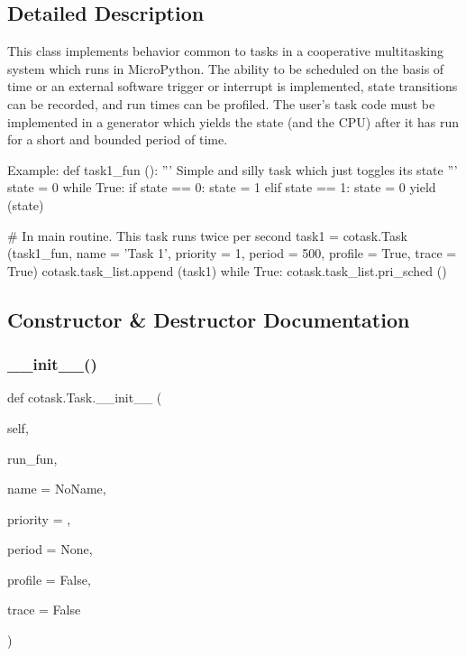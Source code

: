 \subsection{Detailed Description}
\begin{DoxyVerb}This class implements behavior common to tasks in a cooperative 
multitasking system which runs in MicroPython. The ability to be scheduled
on the basis of time or an external software trigger or interrupt is 
implemented, state transitions can be recorded, and run times can be
profiled. The user's task code must be implemented in a generator which
yields the state (and the CPU) after it has run for a short and bounded 
period of time. 

Example:
\code
def task1_fun ():
    ''' Simple and silly task which just toggles its state '''
    state = 0
    while True:
        if state == 0:
            state = 1
        elif state == 1:
            state = 0
        yield (state)

# In main routine. This task runs twice per second
task1 = cotask.Task (task1_fun, name = 'Task 1', priority = 1, 
                     period = 500, profile = True, trace = True)
cotask.task_list.append (task1)
while True: 
    cotask.task_list.pri_sched ()
\endcode \end{DoxyVerb}
 

\subsection{Constructor \& Destructor Documentation}
\mbox{\label{classcotask_1_1Task_a20a30d252e750706e77553a6244ae457}} 
\subsubsection{\texorpdfstring{\+\_\+\+\_\+init\+\_\+\+\_\+()}{\_\_init\_\_()}}
{\footnotesize\ttfamily def cotask.\+Task.\+\_\+\+\_\+init\+\_\+\+\_\+ (\begin{DoxyParamCaption}\item[{}]{self,  }\item[{}]{run\+\_\+fun,  }\item[{}]{name = {\ttfamily \textquotesingle{}NoName\textquotesingle{}},  }\item[{}]{priority = {},  }\item[{}]{period = {\ttfamily None},  }\item[{}]{profile = {\ttfamily False},  }\item[{}]{trace = {\ttfamily False} }\end{DoxyParamCaption})}


